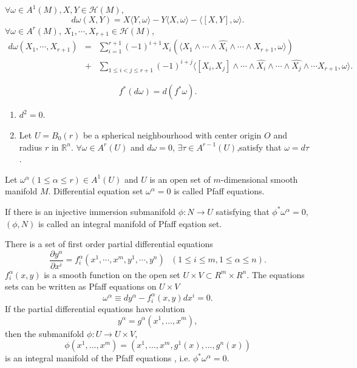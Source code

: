 \begin{newthem}
$\forall \omega \in A^1(M),X,Y \in \mathcal{H}(M)$,
\[d\omega(X,Y) = X \langle Y,\omega \rangle -Y \langle X,\omega \rangle -\langle [X,Y],\omega \rangle .\] 
$\forall \omega \in A^r(M)$, $X_1,\cdots,X_{r+1} \in \mathcal{H}(M)$,
\begin{eqnarray}
d\omega(X_1,\cdots,X_{r+1}) &=& \sum_{i=1}^{r+1}(-1)^{i+1} X_{i}(\langle X_1 \wedge \cdots \wedge \hat{X_i} \wedge \cdots \wedge X_{r+1},\omega \rangle) \nonumber \\
&+& \sum_{1 \leq i < j \leq r+1}(-1)^{i+j} \langle [X_i,X_j] \wedge \cdots \wedge \hat{X_i} \wedge \cdots \wedge \hat{X_j} \wedge \cdots X_{r+1},\omega \rangle. \nonumber
\end{eqnarray}
\end{newthem}

\begin{newthem}
\[f^{*}(d\omega) = d(f^* \omega).\]
\end{newthem}

\begin{newlemma}
\begin{enumerate}
\item $d^2=0$.
\item Let $U=B_0(r)$ be a spherical neighbourhood with center origin $O$ and radius $r$ in $\mathbb{R}^n$. $\forall \omega \in A^r(U)$ and $d\omega =0$, $\exists \tau \in A^{r-1}(U)$,satisfy that $\omega = d\tau$.
\end{enumerate}
\end{newlemma}

\begin{newdef}
Let $\omega^{\alpha}(1 \leq \alpha \leq r) \in A^1(U)$ and $U$ is an open set of $m$-dimensional smooth manifold $M$. Differential equation set $\omega^{\alpha} = 0$ is called Pfaff equations.
\end{newdef}

\begin{newdef}
If there is an injective immersion submanifold $\phi:N \to U$ satisfying that $\phi^{*} \omega^{\alpha} = 0$,$(\phi,N)$ is called an integral manifold of Pfaff eqation set.
\end{newdef}

\begin{newprop}
There is a set of first order partial differential equations
\[\frac{\partial y^{\alpha}}{\partial x^i} = f^{\alpha}_{i}(x^1,\cdots,x^{m},y^1,\cdots,y^{n}) \ \ \ (1 \leq i \leq m,1 \leq \alpha \leq n).\]
$f^{\alpha}_{i}(x,y)$ is a smooth function on the open set $U \times V \subset R^m \times R^n$. The equations sets can be written as Pfaff equations on $U \times V$
\[\omega^{\alpha} \equiv dy^{\alpha} - f^{\alpha}_{i}(x,y)dx^i = 0.\]
If the partial differential equations have solution
\[y^{\alpha} = g^{\alpha}(x^1,\ldots,x^m),\]
then the submanifold $\phi:U \to U \times V$,
\[\phi(x^1,\ldots,x^m) = (x^1,\ldots,x^m,g^1(x),\ldots,g^n(x)) \]
is an integral manifold of the Pfaff equations , i.e. $\phi^* \omega^{\alpha} =0$.
\end{newprop}

